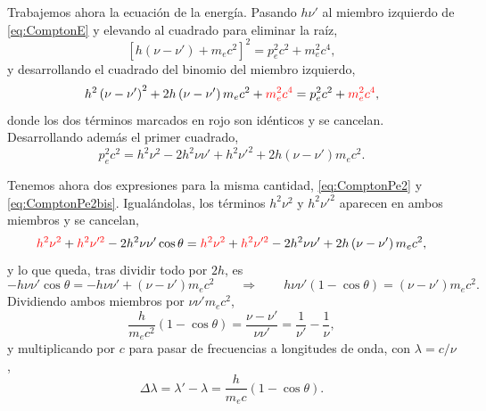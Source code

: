             Trabajemos ahora la ecuación de la energía. Pasando $h\nu'$ al miembro izquierdo de \eqref{eq:ComptonE} y elevando al cuadrado para eliminar la raíz,
            \begin{equation}\label{eq:ComptonECuadrado}
                \left[h\left(\nu-\nu'\right) + m_{e}c^{2}\right]^{2} = p_{e}^{2}c^{2} + m_{e}^{2}c^{4},
            \end{equation}
            y desarrollando el cuadrado del binomio del miembro izquierdo,
            \begin{equation}\label{eq:ComptonDesarrollo}
                h^{2}\left(\nu-\nu'\right)^{2} + 2h\left(\nu-\nu'\right)m_{e}c^{2} + \textcolor{red}{m_{e}^{2}c^{4}} = p_{e}^{2}c^{2} + \textcolor{red}{m_{e}^{2}c^{4}},
            \end{equation}
            donde los dos términos marcados en rojo son idénticos y se cancelan. Desarrollando además el primer cuadrado,
            \begin{equation}\label{eq:ComptonPe2bis}
                p_{e}^{2}c^{2} = h^{2}\nu^{2} - 2h^{2}\nu\nu' + h^{2}\nu'^{2} + 2h\left(\nu-\nu'\right)m_{e}c^{2} .
            \end{equation}

            Tenemos ahora dos expresiones para la misma cantidad, \eqref{eq:ComptonPe2} y \eqref{eq:ComptonPe2bis}. Igualándolas, los términos $h^{2}\nu^{2}$ y $h^{2}\nu'^{2}$ aparecen en ambos miembros y se cancelan,
            \begin{equation}\label{eq:ComptonIgualacion}
                \textcolor{red}{h^{2}\nu^{2}} + \textcolor{red}{h^{2}\nu'^{2}} - 2h^{2}\nu\nu'\cos\theta = \textcolor{red}{h^{2}\nu^{2}} + \textcolor{red}{h^{2}\nu'^{2}} - 2h^{2}\nu\nu' + 2h\left(\nu-\nu'\right)m_{e}c^{2},
            \end{equation}
            y lo que queda, tras dividir todo por $2h$, es
            \begin{equation}\label{eq:ComptonCasi}
                -h\nu\nu'\cos\theta = -h\nu\nu' + \left(\nu-\nu'\right)m_{e}c^{2}
                \qquad\Longrightarrow\qquad
                h\nu\nu'\left(1-\cos\theta\right) = \left(\nu-\nu'\right)m_{e}c^{2} .
            \end{equation}
            Dividiendo ambos miembros por $\nu\nu'm_{e}c^{2}$,
            \begin{equation}\label{eq:ComptonFrecuencias}
                \frac{h}{m_{e}c^{2}}\left(1-\cos\theta\right) = \frac{\nu-\nu'}{\nu\nu'} = \frac{1}{\nu'} - \frac{1}{\nu},
            \end{equation}
            y multiplicando por $c$ para pasar de frecuencias a longitudes de onda, con $\lambda = c/\nu$,
            \begin{equation}\label{eq:Compton}
                \boxed{\;\Delta\lambda = \lambda' - \lambda = \frac{h}{m_{e}c}\left(1-\cos\theta\right) .\;}
            \end{equation}

